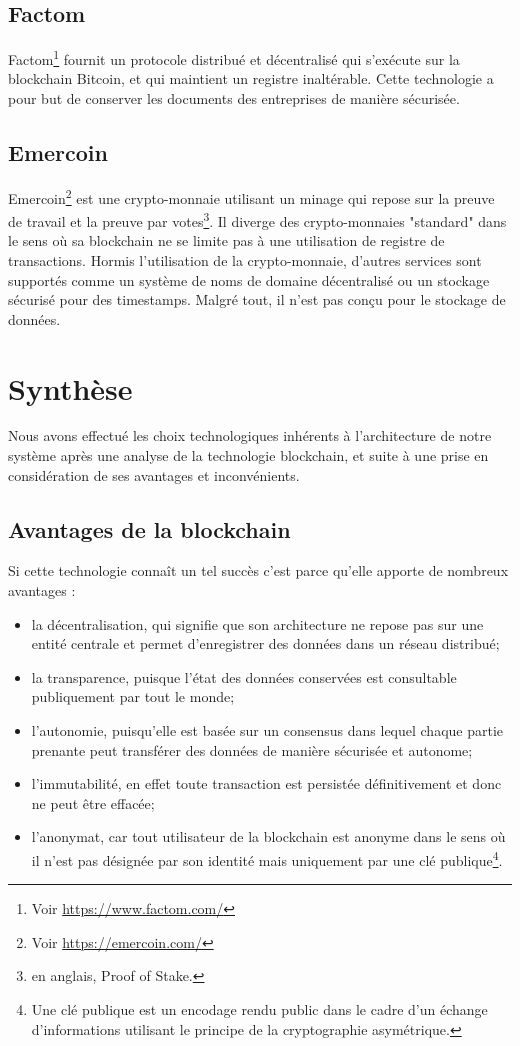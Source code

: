\documentclass{tnreport}
\begin{document}
\subsection{Factom}

Factom\footnote{Voir \url{https://www.factom.com/}} fournit un protocole distribué et décentralisé qui s'exécute sur la blockchain Bitcoin, et qui maintient un registre inaltérable. Cette technologie a pour but de conserver les documents des entreprises de manière sécurisée.

\subsection{Emercoin}

Emercoin\footnote{Voir \url{https://emercoin.com/}} est une crypto-monnaie utilisant un minage qui repose sur la preuve de travail et la preuve par votes\footnote{en anglais, Proof of Stake.}. Il diverge des crypto-monnaies "standard" dans le sens où sa blockchain ne se limite pas à une utilisation de registre de transactions. Hormis l'utilisation de la crypto-monnaie, d'autres services sont supportés comme un système de noms de domaine décentralisé ou un stockage sécurisé pour des timestamps. Malgré tout, il n'est pas conçu pour le stockage de données.

\section{Synthèse}

Nous avons effectué les choix technologiques inhérents à l'architecture de notre système après une analyse de la technologie blockchain, et suite à une prise en considération de ses avantages et inconvénients.

\subsection{Avantages de la blockchain}

Si cette technologie connaît un tel succès c'est parce qu'elle apporte de nombreux avantages : 
\begin{itemize}
	\item la décentralisation, qui signifie que son architecture ne repose pas sur une entité centrale et permet d'enregistrer des données dans un réseau distribué; 
	\item la transparence, puisque l'état des données conservées est consultable publiquement par tout le monde; 
	\item l'autonomie, puisqu'elle est basée sur un consensus dans lequel chaque partie prenante peut transférer des données de manière sécurisée et autonome;
	\item l'immutabilité, en effet toute transaction est persistée définitivement et donc ne peut être effacée;
	\item l'anonymat, car tout utilisateur de la blockchain est anonyme dans le sens où il n'est pas désignée par son identité mais uniquement par une clé publique\footnote{Une clé publique est un encodage rendu public dans le cadre d'un échange d'informations utilisant le principe de la cryptographie asymétrique.}.
\end{itemize}
\end{document}
